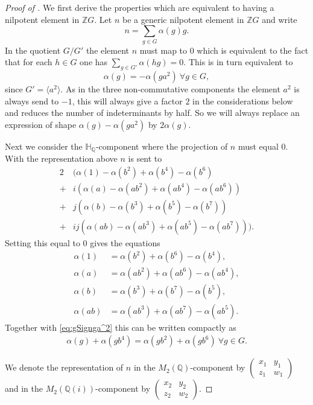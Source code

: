 \documentclass[a4paper,10pt]{amsart}
\theoremstyle{definition}
\theoremstyle{remark}
\begin{document}
\begin{proof}[Proof of ]
We first derive the properties which are equivalent to having a nilpotent element in $\mathbb{Z}G$. Let $n$ be a generic nilpotent element in $\mathbb{Z}G$ and write
\[n = \sum_{g \in G} \alpha(g) g. \]
In the quotient $G/G'$ the element $n$ must map to $0$ which is equivalent to the fact that for each $h \in G$ one has $\sum_{g \in G'} \alpha(hg) = 0$. This is in turn equivalent to
\begin{equation}\label{eq:gSignga^2}
 \alpha(g) = - \alpha(ga^2) \  \forall g \in G, 
\end{equation}
since $G' = \langle a^2 \rangle$. As in the three non-commutative components the element $a^2$ is always send to $-1$, this will always give a factor $2$ in the considerations below and reduces the number of indeterminants by half. So we will always replace an expression of shape $\alpha(g) - \alpha(ga^2)$ by $2\alpha(g)$.

Next we consider the $\mathbb{H}_\mathbb{Q}$-component where the projection of $n$ must equal $0$. With the representation above $n$ is sent to
\begin{align*}
2&(\alpha(1) - \alpha(b^2) + \alpha(b^4) - \alpha(b^6) \\
+&i(\alpha(a) - \alpha(ab^2) + \alpha(ab^4) - \alpha(ab^6)) \\
+&j(\alpha(b) - \alpha(b^3) + \alpha(b^5) - \alpha(b^7)) \\
+&ij(\alpha(ab) - \alpha(ab^3) + \alpha(ab^5) - \alpha(ab^7))).
\end{align*} 
Setting this equal to $0$ gives the equations
\begin{align}
\alpha(1) &= \alpha(b^2) + \alpha(b^6) - \alpha(b^4), \nonumber \\ 
\alpha(a) &= \alpha(ab^2) + \alpha(ab^6) - \alpha(ab^4), \nonumber \\ 
\alpha(b) &= \alpha(b^3) + \alpha(b^7) - \alpha(b^5), \label{eq:H} \\ 
\alpha(ab) &= \alpha(ab^3) + \alpha(ab^7) - \alpha(ab^5). \nonumber
\end{align}
Together with \eqref{eq:gSignga^2} this can be written compactly as 
\begin{align}\label{eq:gCoefModb4}
\alpha(g) + \alpha(gb^4) = \alpha(gb^2) + \alpha(gb^6) \ \forall g \in G.
\end{align}

We denote the representation of $n$ in the  $M_2(\mathbb{Q})$-component by $\begin{pmatrix} x_1 & y_1 \\ z_1 & w_1 \end{pmatrix}$ and in the $M_2(\mathbb{Q}(i))$-component by $\begin{pmatrix} x_2 & y_2 \\ z_2 & w_2 \end{pmatrix}$.


\end{proof}
\end{document}
